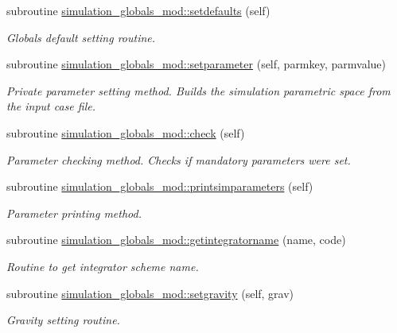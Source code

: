 \begin{DoxyCompactItemize}
\item 
subroutine \hyperlink{namespacesimulation__globals__mod_ac2ac06271de377004c67b6ba2f3ed353}{simulation\+\_\+globals\+\_\+mod\+::setdefaults} (self)
\begin{DoxyCompactList}\small\item\em Globals default setting routine. \end{DoxyCompactList}\item 
subroutine \hyperlink{namespacesimulation__globals__mod_a8a05831d4c3e3eb5741d65978f6fcf61}{simulation\+\_\+globals\+\_\+mod\+::setparameter} (self, parmkey, parmvalue)
\begin{DoxyCompactList}\small\item\em Private parameter setting method. Builds the simulation parametric space from the input case file. \end{DoxyCompactList}\item 
subroutine \hyperlink{namespacesimulation__globals__mod_a41249abb5c33ef9e8bff448f0b3826fa}{simulation\+\_\+globals\+\_\+mod\+::check} (self)
\begin{DoxyCompactList}\small\item\em Parameter checking method. Checks if mandatory parameters were set. \end{DoxyCompactList}\item 
subroutine \hyperlink{namespacesimulation__globals__mod_a97c04d0289a9f2d004a9329cb7ab16f0}{simulation\+\_\+globals\+\_\+mod\+::printsimparameters} (self)
\begin{DoxyCompactList}\small\item\em Parameter printing method. \end{DoxyCompactList}\item 
subroutine \hyperlink{namespacesimulation__globals__mod_a68e871ed8e5d3930884e968c6fdafddc}{simulation\+\_\+globals\+\_\+mod\+::getintegratorname} (name, code)
\begin{DoxyCompactList}\small\item\em Routine to get integrator scheme name. \end{DoxyCompactList}\item 
subroutine \hyperlink{namespacesimulation__globals__mod_a9e92dfed4ef7388208adce768f064554}{simulation\+\_\+globals\+\_\+mod\+::setgravity} (self, grav)
\begin{DoxyCompactList}\small\item\em Gravity setting routine. \end{DoxyCompactList}\item 

\end{DoxyCompactItemize}
